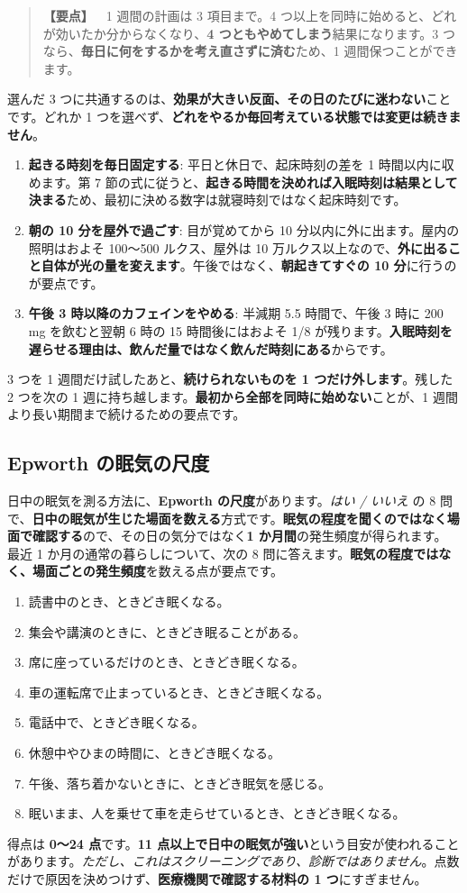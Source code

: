 \documentclass{article}
\begin{document}
\begin{quote}
\textbf{【要点】}\ \ 1 週間の計画は 3 項目まで。4 つ以上を同時に始めると、どれが効いたか分からなくなり、\textbf{4 つともやめてしまう}結果になります。3 つなら、\textbf{毎日に何をするかを考え直さずに済む}ため、1 週間保つことができます。
\end{quote}
選んだ 3 つに共通するのは、\textbf{効果が大きい反面、その日のたびに迷わない}ことです。どれか 1 つを選べず、\textbf{どれをやるか毎回考えている状態では変更は続きません}。
\begin{enumerate}
\item \textbf{起きる時刻を毎日固定する}: 平日と休日で、起床時刻の差を 1 時間以内に収めます。第 7 節の式に従うと、\textbf{起きる時間を決めれば入眠時刻は結果として決まる}ため、最初に決める数字は就寝時刻ではなく起床時刻です。
\item \textbf{朝の 10 分を屋外で過ごす}: 目が覚めてから 10 分以内に外に出ます。屋内の照明はおよそ 100〜500 ルクス、屋外は 10 万ルクス以上なので、\textbf{外に出ること自体が光の量を変えます}。午後ではなく、\textbf{朝起きてすぐの 10 分}に行うのが要点です。
\item \textbf{午後 3 時以降のカフェインをやめる}: 半減期 5.5 時間で、午後 3 時に 200 mg を飲むと翌朝 6 時の 15 時間後にはおよそ 1/8 が残ります。\textbf{入眠時刻を遅らせる理由は、飲んだ量ではなく飲んだ時刻にある}からです。
\end{enumerate}
3 つを 1 週間だけ試したあと、\textbf{続けられないものを 1 つだけ外します}。残した 2 つを次の 1 週に持ち越します。\textbf{最初から全部を同時に始めない}ことが、1 週間より長い期間まで続けるための要点です。

\subsection{Epworth の眠気の尺度}

日中の眠気を測る方法に、\textbf{Epworth の尺度}があります。\emph{はい / いいえ} の 8 問で、\textbf{日中の眠気が生じた場面を数える}方式です。\textbf{眠気の程度を聞くのではなく場面で確認する}ので、その日の気分ではなく\textbf{1 か月間}の発生頻度が得られます。
最近 1 か月の通常の暮らしについて、次の 8 問に答えます。\textbf{眠気の程度ではなく、場面ごとの発生頻度}を数える点が要点です。
\begin{enumerate}
\item 読書中のとき、ときどき眠くなる。
\item 集会や講演のときに、ときどき眠ることがある。
\item 席に座っているだけのとき、ときどき眠くなる。
\item 車の運転席で止まっているとき、ときどき眠くなる。
\item 電話中で、ときどき眠くなる。
\item 休憩中やひまの時間に、ときどき眠くなる。
\item 午後、落ち着かないときに、ときどき眠気を感じる。
\item 眠いまま、人を乗せて車を走らせているとき、ときどき眠くなる。
\end{enumerate}
得点は \textbf{0〜24 点}です。\textbf{11 点以上で日中の眠気が強い}という目安が使われることがあります。\emph{ただし、これはスクリーニングであり、診断ではありません}。点数だけで原因を決めつけず、\textbf{医療機関で確認する材料の 1 つ}にすぎません。
\end{document}
